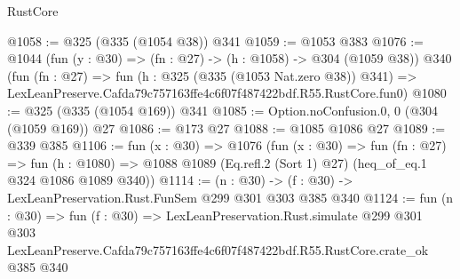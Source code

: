\begin{lexlean}{RustCore}
\begin{coremodule}
@1058 := @325 (@335 (@1054 @38)) @341
@1059 := @1053 @383
@1076 := @1044
    (fun (y : @30) => (fn : @27) -> (h : @1058) -> @304 (@1059 @38))
    @340
    (fun (fn : @27) =>
    fun (h : @325 (@335 (@1053 Nat.zero @38)) @341) =>
    LexLeanPreserve.Cafda79c757163ffe4c6f07f487422bdf.R55.RustCore.fun0)
@1080 := @325 (@335 (@1054 @169)) @341
@1085 := Option.noConfusion.{0, 0} (@304 (@1059 @169)) @27
@1086 := @173 @27
@1088 := @1085 @1086 @27
@1089 := @339 @385
@1106 := fun (x : @30) =>
  @1076
    (fun (x : @30) =>
    fun (fn : @27) =>
    fun (h : @1080) => @1088 @1089 (Eq.refl.{2} (Sort 1) @27) (heq_of_eq.{1} @324 @1086 @1089 @340))
@1114 := (n : @30) -> (f : @30) -> LexLeanPreservation.Rust.FunSem @299 @301 @303 @385 @340
@1124 := fun (n : @30) =>
  fun (f : @30) =>
  LexLeanPreservation.Rust.simulate
    @299
    @301
    @303
    LexLeanPreserve.Cafda79c757163ffe4c6f07f487422bdf.R55.RustCore.crate_ok
    @385
    @340
\end{coremodule}
\end{lexlean}
